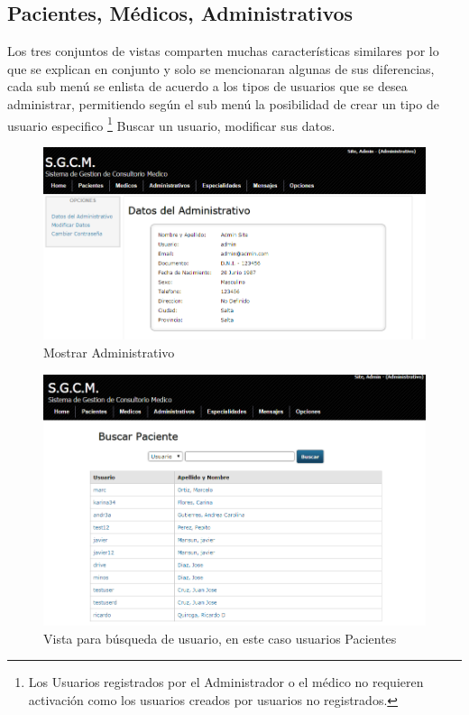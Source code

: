 \subsection{Pacientes, Médicos, Administrativos}

Los tres conjuntos de vistas comparten muchas características similares por lo que se explican en conjunto y solo se mencionaran algunas de sus diferencias, cada sub menú se enlista de acuerdo a los tipos de usuarios que se desea administrar, permitiendo según el sub menú la posibilidad de crear un tipo de usuario especifico \footnote{Los Usuarios registrados por el Administrador o el médico no requieren activación como los usuarios creados por usuarios no registrados.} Buscar un usuario, modificar sus datos.


\begin{figure}[H]
    \centering
    \includegraphics[scale=0.5]{resourse/datos-admin.png}
    \caption{Mostrar Administrativo}
    \label{fig:615}
\end{figure}

\begin{figure}[H]
    \centering
    \includegraphics[scale=0.5]{resourse/listado-paciente.png}
    \caption{Vista para búsqueda de usuario, en este caso usuarios Pacientes}
    \label{fig:616}
\end{figure}

